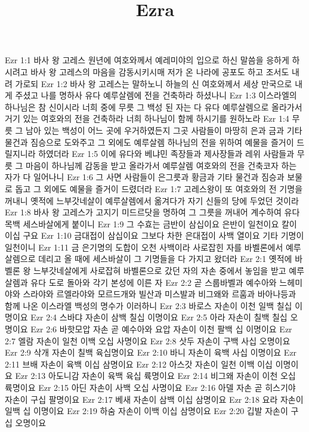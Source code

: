 

\title{Ezra}

Ezr 1:1  바사 왕 고레스 원년에 여호와께서 예레미야의 입으로 하신 말씀을 응하게 하시려고 바사 왕 고레스의 마음을 감동시키시매 저가 온 나라에 공포도 하고 조서도 내려 가로되
Ezr 1:2  바사 왕 고레스는 말하노니 하늘의 신 여호와께서 세상 만국으로 내게 주셨고 나를 명하사 유다 예루살렘에 전을 건축하라 하셨나니
Ezr 1:3  이스라엘의 하나님은 참 신이시라 너희 중에 무릇 그 백성 된 자는 다 유다 예루살렘으로 올라가서 거기 있는 여호와의 전을 건축하라 너희 하나님이 함께 하시기를 원하노라
Ezr 1:4  무릇 그 남아 있는 백성이 어느 곳에 우거하였든지 그곳 사람들이 마땅히 은과 금과 기타 물건과 짐승으로 도와주고 그 외에도 예루살렘 하나님의 전을 위하여 예물을 즐거이 드릴지니라 하였더라
Ezr 1:5  이에 유다와 베냐민 족장들과 제사장들과 레위 사람들과 무릇 그 마음이 하나님께 감동을 받고 올라가서 예루살렘 여호와의 전을 건축코자 하는 자가 다 일어나니
Ezr 1:6  그 사면 사람들이 은그릇과 황금과 기타 물건과 짐승과 보물로 돕고 그 외에도 예물을 즐거이 드렸더라
Ezr 1:7  고레스왕이 또 여호와의 전 기명을 꺼내니 옛적에 느부갓네살이 예루살렘에서 옮겨다가 자기 신들의 당에 두었던 것이라
Ezr 1:8  바사 왕 고레스가 고지기 미드르닷을 명하여 그 그릇을 꺼내어 계수하여 유다 목백 세스바살에게 붙이니
Ezr 1:9  그 수효는 금반이 삼십이요 은반이 일천이요 칼이 이십 구요
Ezr 1:10  금대접이 삼십이요 그보다 차한 은대접이 사백 열이요 기타 기명이 일천이니
Ezr 1:11  금 은기명의 도합이 오천 사백이라 사로잡힌 자를 바벨론에서 예루살렘으로 데리고 올 때에 세스바살이 그 기명들을 다 가지고 왔더라
Ezr 2:1  옛적에 바벨론 왕 느부갓네살에게 사로잡혀 바벨론으로 갔던 자의 자손 중에서 놓임을 받고 예루살렘과 유다 도로 돌아와 각기 본성에 이른 자
Ezr 2:2  곧 스룹바벨과 예수아와 느헤미야와 스라야와 르엘라야와 모르드개와 빌산과 미스발과 비그왜와 르훔과 바아나등과 함께 나온 이스라엘 백성의 명수가 이러하니
Ezr 2:3  바로스 자손이 이천 일백 칠십 이명이요
Ezr 2:4  스바댜 자손이 삼백 칠십 이명이요
Ezr 2:5  아라 자손이 칠백 칠십 오명이요
Ezr 2:6  바핫모압 자손 곧 예수아와 요압 자손이 이천 팔백 십 이명이요
Ezr 2:7  엘람 자손이 일천 이백 오십 사명이요
Ezr 2:8  삿두 자손이 구백 사십 오명이요
Ezr 2:9  삭개 자손이 칠백 육십명이요
Ezr 2:10  바니 자손이 육백 사십 이명이요
Ezr 2:11  브배 자손이 육백 이십 삼명이요
Ezr 2:12  아스갓 자손이 일천 이백 이십 이명이요
Ezr 2:13  아도니감 자손이 육백 육십 륙명이요
Ezr 2:14  비그왜 자손이 이천 오십 륙명이요
Ezr 2:15  아딘 자손이 사백 오십 사명이요
Ezr 2:16  아델 자손 곧 히스기야 자손이 구십 팔명이요
Ezr 2:17  베새 자손이 삼백 이십 삼명이요
Ezr 2:18  요라 자손이 일백 십 이명이요
Ezr 2:19  하숨 자손이 이백 이십 삼명이요
Ezr 2:20  깁발 자손이 구십 오명이요
